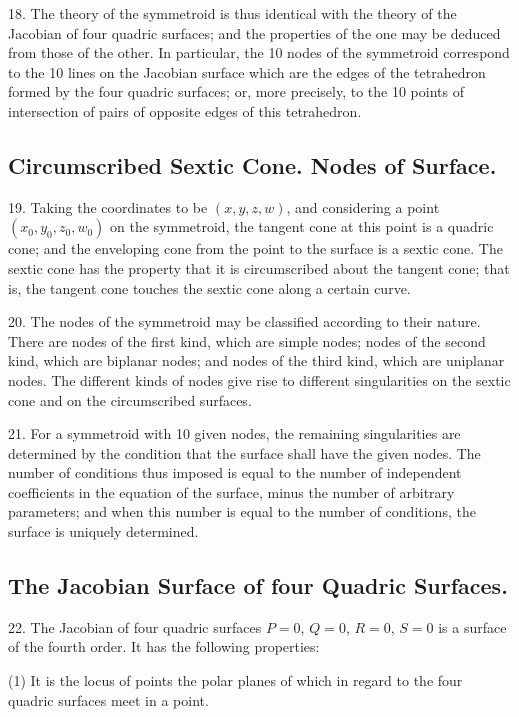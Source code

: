 \documentclass[11pt,a4paper]{article}
\begin{document}
18. The theory of the symmetroid is thus identical with the theory of the Jacobian of four quadric surfaces; and the properties of the one may be deduced from those of the other. In particular, the 10 nodes of the symmetroid correspond to the 10 lines on the Jacobian surface which are the edges of the tetrahedron formed by the four quadric surfaces; or, more precisely, to the 10 points of intersection of pairs of opposite edges of this tetrahedron.

\subsection*{Circumscribed Sextic Cone. Nodes of Surface.}

19. Taking the coordinates to be $(x, y, z, w)$, and considering a point $(x_0, y_0, z_0, w_0)$ on the symmetroid, the tangent cone at this point is a quadric cone; and the enveloping cone from the point to the surface is a sextic cone. The sextic cone has the property that it is circumscribed about the tangent cone; that is, the tangent cone touches the sextic cone along a certain curve.

20. The nodes of the symmetroid may be classified according to their nature. There are nodes of the first kind, which are simple nodes; nodes of the second kind, which are biplanar nodes; and nodes of the third kind, which are uniplanar nodes. The different kinds of nodes give rise to different singularities on the sextic cone and on the circumscribed surfaces.

21. For a symmetroid with 10 given nodes, the remaining singularities are determined by the condition that the surface shall have the given nodes. The number of conditions thus imposed is equal to the number of independent coefficients in the equation of the surface, minus the number of arbitrary parameters; and when this number is equal to the number of conditions, the surface is uniquely determined.

\subsection*{The Jacobian Surface of four Quadric Surfaces.}

22. The Jacobian of four quadric surfaces $P = 0$, $Q = 0$, $R = 0$, $S = 0$ is a surface of the fourth order. It has the following properties:

(1) It is the locus of points the polar planes of which in regard to the four quadric surfaces meet in a point.
\end{document}
